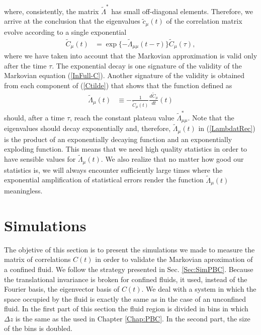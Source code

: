 \documentclass[b5paper,openright,10pt]{book}
\begin{document}
where,   consistently,  the   matrix  $\tilde{\Lambda}^*$   has  small
off-diagonal elements.   Therefore, we  arrive at the  conclusion that
the eigenvalues  $\tilde{c}_\mu(t)$ of  the correlation  matrix evolve
according to a single exponential
\begin{align}
  \tilde{C}_\mu(t)&=\exp\{-\tilde{\Lambda}_{\mu\mu} (t-\tau)\}  \tilde{C}_\mu(\tau),
\end{align}
where we have  taken into account that the  Markovian approximation is
valid  only  after the  time  $\tau$.  The  exponential decay  is  one
signature    of   the    validity    of    the   Markovian    equation
(\ref{InFull-C}). Another  signature of the validity  is obtained from
each component of (\ref{Ctilde}) that  shows that the function defined
as
\begin{align}
  \tilde{\Lambda}_{\mu}(t)&\equiv -\frac{1}{{\tilde{C}}_{\mu}(t)}\frac{d{\tilde{C}}_{\mu}}{dt}(t)
\label{LambdatRec}
\end{align}
should,  after  a time  $\tau$,  reach  the  constant plateau  value  $
\tilde{\Lambda}_{\mu\mu}^*$.  Note  that the eigenvalues  should decay
exponentially  and,  therefore,  $  \tilde{\Lambda}_{\mu}(t)$ in (\ref{LambdatRec}) is  the
product  of an  exponentially decaying  function and  an exponentially
exploding function. This means that we need high quality statistics in
order  to have  sensible values  for $  \tilde{\Lambda}_{\mu}(t)$.  We
also realize that no matter how good our statistics is, we will always
encounter sufficiently large times where the exponential amplification
of statistical errors render  the function $ \tilde{\Lambda}_{\mu}(t)$
meaningless.


\section{Simulations}
\label{Sec:SimWALLS}
The objetive of this section is to present the simulations we made to measure the matrix of correlations $C(t)$ in order to validate the Markovian aproximation of a confined fluid. 
We follow the strategy presented in Sec. \ref{Sec:SimPBC}. Because the translational invariance is broken for confined fluids, it used, instead of the Fourier basis, the eigenvector basis of $C(t)$. 
We deal with a system in which the space occupied by the fluid is exactly the same as in the case of an unconfined fluid. In the first part of this section the fluid region is divided in bins in which $\Delta z$ is the same as the used in Chapter \ref{Chap:PBC}. In the second part, the size of the bins is doubled. 
\end{document}
